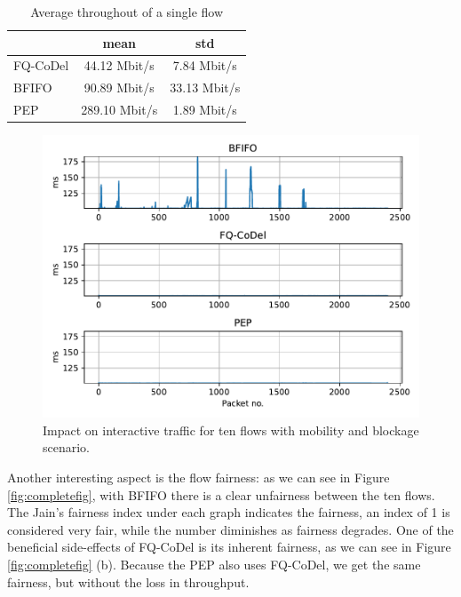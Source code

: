 \documentclass[a4paper,english, 11pt]{report}
\begin{document}
\begin{table}[h!]
\centering
\begin{tabular}{l|c|c}
\hline
 & \textbf{mean} & \textbf{std} \\ 
\hline
FQ-CoDel & 44.12 Mbit/s      & 7.84 Mbit/s \\
BFIFO    & 90.89 Mbit/s      & 33.13 Mbit/s  \\
PEP      & 289.10 Mbit/s      & 1.89 Mbit/s   \\
\hline
\end{tabular}
\caption{Average throughout of a single flow}
\label{tab:throughput_10flows_table}
\end{table}

\begin{figure}[!h!] %
	\centering
	\includegraphics[scale=0.65]{../diagrams/witestlab/throughput/10flows/latency.pdf}
  	\caption{Impact on interactive traffic for ten flows with mobility and blockage scenario.}
  	\label{fig:latency_10_flows}
\end{figure}

Another interesting aspect is the flow fairness: as we can see in Figure \ref{fig:completefig}, with BFIFO there is a clear unfairness between the ten flows. The Jain's fairness index under each graph indicates the fairness, an index of 1 is considered very fair, while the number diminishes as fairness degrades. One of the beneficial side-effects of FQ-CoDel is its inherent fairness, as we can see in Figure \ref{fig:completefig} (b). Because the PEP also uses FQ-CoDel, we get the same fairness, but without the loss in throughput.\\
\end{document}
